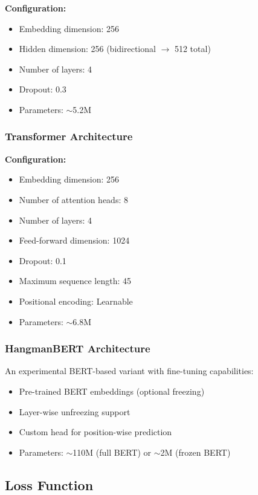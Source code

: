 \documentclass[12pt,a4paper]{article}
\begin{document}
\textbf{Configuration:}
\begin{itemize}
    \item Embedding dimension: 256
    \item Hidden dimension: 256 (bidirectional $\rightarrow$ 512 total)
    \item Number of layers: 4
    \item Dropout: 0.3
    \item Parameters: $\sim$5.2M
\end{itemize}

\subsubsection{Transformer Architecture}

\textbf{Configuration:}
\begin{itemize}
    \item Embedding dimension: 256
    \item Number of attention heads: 8
    \item Number of layers: 4
    \item Feed-forward dimension: 1024
    \item Dropout: 0.1
    \item Maximum sequence length: 45
    \item Positional encoding: Learnable
    \item Parameters: $\sim$6.8M
\end{itemize}

\subsubsection{HangmanBERT Architecture}

An experimental BERT-based variant with fine-tuning capabilities:
\begin{itemize}
    \item Pre-trained BERT embeddings (optional freezing)
    \item Layer-wise unfreezing support
    \item Custom head for position-wise prediction
    \item Parameters: $\sim$110M (full BERT) or $\sim$2M (frozen BERT)
\end{itemize}

\subsection{Loss Function}
\end{document}
